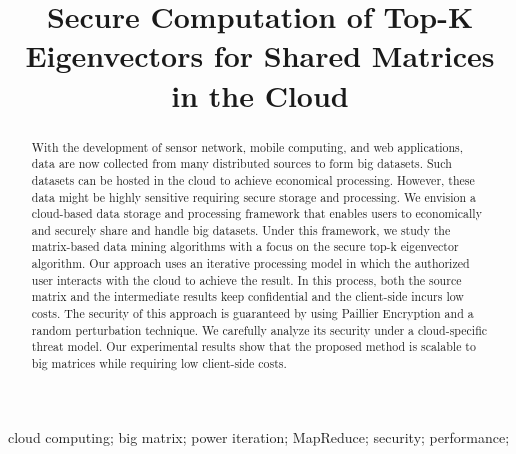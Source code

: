 \documentclass[10pt, conference, compsocconf]{IEEEtran}
\begin{document}
\title{Secure Computation of Top-K Eigenvectors for Shared Matrices in the Cloud}

\author{
}

\maketitle


\begin{abstract}
With the development of sensor network, mobile computing, and web applications, data are now collected from many distributed sources to form big datasets. Such datasets can be hosted in the cloud to achieve economical processing. However, these data might be highly sensitive requiring secure storage and processing. We envision a cloud-based data storage and processing framework that enables users to economically and securely share and handle big datasets. Under this framework, we study the matrix-based data mining algorithms with a focus on the secure top-k eigenvector algorithm. Our approach uses an iterative processing model in which the authorized user interacts with the cloud to achieve the result. In this process, both the source matrix and the intermediate results keep confidential and the client-side incurs low costs. The security of this approach is guaranteed by using Paillier Encryption and a random perturbation technique. We carefully analyze its security under a cloud-specific threat model. Our experimental results show that the proposed method is scalable to big matrices while requiring low client-side costs.
\end{abstract}

\begin{IEEEkeywords}
cloud computing; big matrix; power iteration; MapReduce; security; performance;
\end{IEEEkeywords}

\IEEEpeerreviewmaketitle
\end{document}
